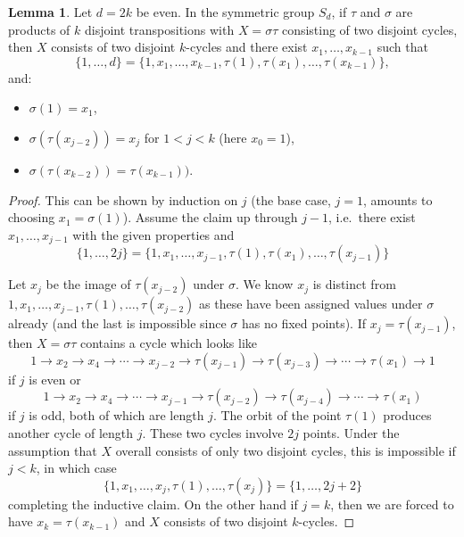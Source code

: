 \documentclass[thesis]{thesis-umich}           %
\theoremstyle{definition}
\newtheorem{lem}[thm]{Lemma}
\begin{document}
\begin{lem}
  \label{lem:even}
  Let $d=2k$ be even. In the symmetric group $S_d$, if $\tau$ and $\sigma$ are products of $k$ disjoint
  transpositions with $X=\sigma\tau$ consisting of two disjoint cycles, then $X$
  consists of two disjoint $k$-cycles and there exist
  $x_1,\dots,x_{k-1}$ such that
  \[
  \{1,\dots,d\}=\{1,x_1,\dots,x_{k-1},\tau(1),\tau(x_1),\dots,\tau(x_{k-1})\},
  \]
  and:
  \begin{itemize}
  \item $\sigma(1)=x_1$, 
  \item $\sigma(\tau(x_{j-2}))=x_j$ for $1<j<k$ (here $x_0=1$),
  \item $\sigma(\tau(x_{k-2}))= \tau(x_{k-1}))$.
  \end{itemize}
\end{lem}
\begin{proof}
  This can be shown by induction on $j$ (the base case, $j=1$, amounts to choosing $x_1=\sigma(1)$).
  Assume the claim up through $j-1$, i.e.\ there exist
  $x_1,\dots,x_{j-1}$ with the given properties and
  \[\{1,\dots,2j\}=\{1,x_1,\dots,x_{j-1},\tau(1),\tau(x_1),\dots,\tau(x_{j-1})\}\]

  Let $x_j$ be
  the image of $\tau(x_{j-2})$ under $\sigma$.
  We know $x_j$ is distinct from $1,x_1,\dots,x_{j-1},\tau(1),\dots,\tau(x_{j-2})$
  as these have been assigned values under $\sigma$ already (and the last is impossible
  since $\sigma$ has no fixed points).
  If $x_j=\tau(x_{j-1})$, then $X=\sigma\tau$ contains a cycle
  which looks like
  \[
  1\to x_2\to x_4\to\cdots\to x_{j-2}\to \tau(x_{j-1})\to \tau(x_{j-3})\to\cdots\to \tau(x_1)\to 1
  \]
  if $j$ is even or
  \[
  1\to x_2\to x_4\to\cdots\to x_{j-1}\to \tau(x_{j-2})\to \tau(x_{j-4})\to\cdots\to \tau(x_1)
  \]
  if $j$ is odd, both of which are length $j$. The orbit of the point $\tau(1)$ produces
  another cycle of length $j$. These two cycles involve $2j$ points.
  Under the assumption that $X$ overall consists of only
  two disjoint cycles, this is impossible if $j<k$, in which case
  \[
  \{1,x_1,\dots,x_{j},\tau(1),\dots,\tau(x_{j})\}=\{1,\dots,2j+2\}
  \]
  completing the inductive claim. On the other hand if $j=k$, then
  we are forced to have $x_k=\tau(x_{k-1})$
  and $X$ consists of two disjoint $k$-cycles.

  \end{proof}
\end{document}
